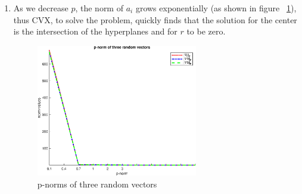 \documentclass[10pt]{article}
\newcommand{\0}{\mat{0}}
\begin{document}
\begin{enumerate}
\begin{enumerate}
\begin{verbatim}
% Compute the Chebyshev center of a polyhedron
function [x_sol, r_sol, x, y] = chebyshev_center_with_norm(A, b, p)
% The goal is to find the largest Euclidean ball (i.e. its center and
% radius) that lies in a polyhedron described by linear inequalites in this
% fashion: P = {x : a_i'*x <= b_i, i=1,...,m}

rng('default')
format long g
[~,n]=size(A);

% Build and execute model
fprintf(1,'Computing Chebyshev center...');
cvx_begin
    variable r(1)
    variable x_c(2)
    maximize ( r )
    for k=1:n
        A(:, k)' * x_c + r * norm(A(:, k), p) <= b(k);
    end
cvx_end
fprintf(1,'Done! \n');
x_sol = x_c;
r_sol = r;


% Display results
fprintf(1,"The Chebyshev center coordinates are: \n");
disp(x_c);
txt = "Radius of largest 'scaled unit ball' using norm p:" + num2str(p) + "\n";
fprintf(1,txt);
disp(r);

% Generate the figure
x = linspace(-2,2);
for k=1:n
    plot(x, -x * A(1,k)./A(2,k) + b(k)./A(2,k),"b-");
    hold on
end

n_vecs = 100;
[x, y] = gen_random_vectors(n_vecs, p);
x = x.* r + x_c(1);
y = y.* r + x_c(2);

for i=1:n_vecs
    plot(x(i), y(i), "r." );
    hold on
end
plot(x_c(1),x_c(2),'b*');
xlabel("x-axis")
ylabel("y-axis")

txt1 = "# inequalities:" + num2str(n);
tx2 = "norm-p:" + num2str(p);
title({"Largest 'scaled unit ball' lying in a 2D polyhedron", txt1, tx2});
text(x_c(1), x_c(2), "\leftarrow  center")
axis([-1 1 -1 1])
axis equal
hold off
txt = "chebyshev_center_norm_" + num2str(p);
saveas(gcf,txt,'epsc')

function [x, y] = gen_random_vectors(n, p)
    r = randn(n, 2); % Use a large n
    for i=1:n
        norm_r = norm(r(i,:), p);
        r(i, :) = r(i, :) ./ norm_r;
    end
    x = r(:, 1);
    y = r(:, 2);
    
\end{verbatim}

\item As we decrease $p$, the norm of $a_i$ grows exponentially (as shown in figure ~\ref{fig6}), thus CVX, to solve the problem, quickly finds that the solution for the center is the intersection of the hyperplanes and for $r$ to be zero.

\begin{figure}[H]
	\centering
	\includegraphics[width=200pt]{figures/p_norm_trend}
	\caption{p-norms of three random vectors }
	\label{fig6}
\end{figure}


\end{enumerate}
\end{enumerate}
\end{document}
